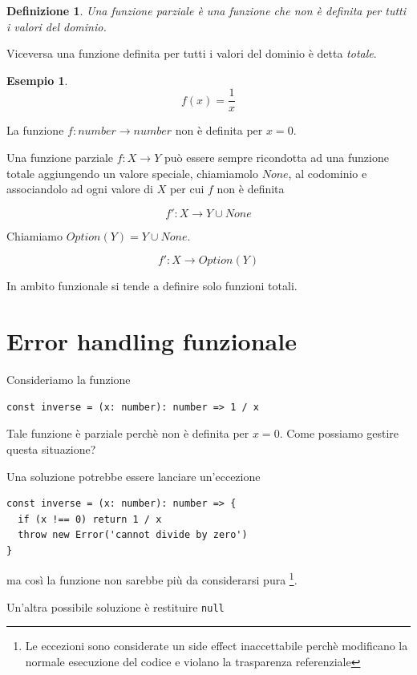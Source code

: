 \documentclass[12pt]{article}
\newtheorem{definition}{Definizione}
\newtheorem{example}{Esempio}
\begin{document}
\begin{definition}
Una funzione \emph{parziale} è una funzione che non è definita per tutti i valori del dominio.
\end{definition}

Viceversa una funzione definita per tutti i valori del dominio è detta \emph{totale}.

\begin{example}
$$
f(x) = \frac{1}{x}
$$
\end{example}

La funzione $f: number \rightarrow number$ non è definita per $x = 0$.

Una funzione parziale $f: X \rightarrow Y$ può essere sempre ricondotta ad una funzione totale aggiungendo un valore speciale,
chiamiamolo $None$, al codominio e associandolo ad ogni valore di $X$ per cui $f$ non è definita

$$
f': X \rightarrow Y \cup None
$$

Chiamiamo $Option(Y) = Y \cup None$.

$$
f': X \rightarrow Option(Y)
$$

In ambito funzionale si tende a definire solo funzioni totali.

\newpage

\section{Error handling funzionale}

Consideriamo la funzione

\begin{verbatim}
const inverse = (x: number): number => 1 / x
\end{verbatim}

Tale funzione è parziale perchè non è definita per $x = 0$. Come possiamo gestire questa situazione?

Una soluzione potrebbe essere lanciare un'eccezione

\begin{verbatim}
const inverse = (x: number): number => {
  if (x !== 0) return 1 / x
  throw new Error('cannot divide by zero')
}
\end{verbatim}

ma così la funzione non sarebbe più da considerarsi pura
\footnote{Le eccezioni sono considerate un side effect inaccettabile perchè modificano la normale esecuzione del codice
e violano la trasparenza referenziale}.

Un'altra possibile soluzione è restituire \texttt{null}
\end{document}
